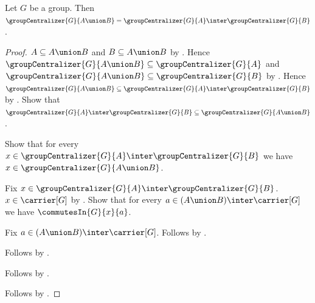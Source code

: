 \begin{theorem}\label{group_centralizer_union}
    Let $G$ be a group.
    Then
        $\groupCentralizer{G}{A\union B}=
         \groupCentralizer{G}{A}\inter
         \groupCentralizer{G}{B}$.
\end{theorem}
\begin{proof}
    $A\subseteq A\union B$ and $B\subseteq A\union B$ by
        .
    Hence
        $\groupCentralizer{G}{A\union B}\subseteq
            \groupCentralizer{G}{A}$ and
        $\groupCentralizer{G}{A\union B}\subseteq
            \groupCentralizer{G}{B}$ by
        .
    Hence
        $\groupCentralizer{G}{A\union B}\subseteq
            \groupCentralizer{G}{A}\inter
            \groupCentralizer{G}{B}$ by
        .
    Show that
        $\groupCentralizer{G}{A}\inter
            \groupCentralizer{G}{B}\subseteq
        \groupCentralizer{G}{A\union B}$.
    \begin{subproof}
        Show that for every
            $x\in\groupCentralizer{G}{A}\inter
                \groupCentralizer{G}{B}$ we have
            $x\in\groupCentralizer{G}{A\union B}$.
        \begin{subproof}
            Fix
                $x\in\groupCentralizer{G}{A}\inter
                    \groupCentralizer{G}{B}$.
            $x\in\carrier[G]$ by
                .
            Show that for every
                $a\in(A\union B)\inter\carrier[G]$ we have
                $\commutesIn{G}{x}{a}$.
            \begin{subproof}
                Fix $a\in(A\union B)\inter\carrier[G]$.
                Follows by
                    .
            \end{subproof}
            Follows by .
        \end{subproof}
        Follows by .
    \end{subproof}
    Follows by .
\end{proof}

